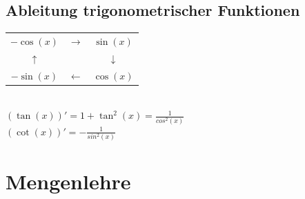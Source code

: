 \documentclass[german]{latex4ei/latex4ei_sheet}
\begin{document}
\begin{sectionbox}
\subsection{Ableitung trigonometrischer Funktionen}
\begin{tabular}{ccc}
	$-\cos (x)$ & $ \rightarrow$ & $\sin (x)$\\
	$\uparrow $ & 			   & $\downarrow$\\
	$-\sin (x)$	& $\leftarrow$ & $\cos (x)$\\
\end{tabular}\\
$(\tan(x))'=1+\tan^2(x) = \frac{1}{cos^2(x)}$\\
$(\cot(x))'=-\frac{1}{sin^2(x)}$


\end{sectionbox}

\columnbreak

\section{Mengenlehre}
\end{document}
